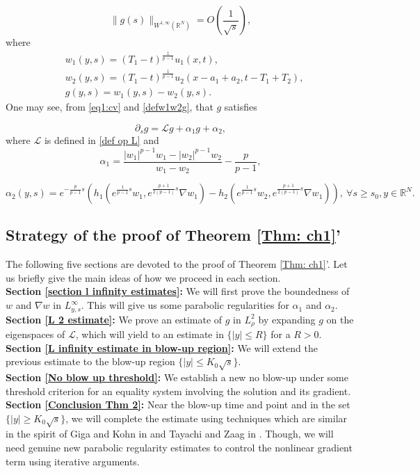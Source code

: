\documentclass[11pt,a4paper]{article}
\newcommand{\1}{\mathbbm{1}}
\numberwithin{equation}{section}
\newcommand{\numberset}{\mathbb}
\newcommand{\R}{\numberset{R}}
\theoremstyle{remark}
\begin{document}
\begin{equation}\label{eq:rough}
\|g(s)\|_{W^{1,\infty}(\R^N)}=O\left(\frac{1}{\sqrt{s}}\right),
\end{equation}
where 
\begin{equation}\label{defw1w2g}
\begin{aligned}
&w_1(y,s)=(T_1-t)^{\frac{1}{p-1}}u_1(x,t),\\
&w_2(y,s)=(T_1-t)^{\frac{1}{p-1}}u_2(x-a_1+a_2,t-T_1+T_2),\\
&g(y,s)=w_1(y,s)-w_2(y,s).
\end{aligned}
\end{equation}
One may see, from \eqref{eq1:cv} and \eqref{defw1w2g}, that $g$ satisfies

\begin{equation}\label{eq3: g}
\partial_s g=\mathcal{L}g+\alpha_1 g+\alpha_2,
\end{equation}
where $\mathcal{L}$ is defined in \eqref{def op L} and
\begin{equation}\label{alpha1}
\alpha_1=\frac{|w_1|^{p-1}w_1-|w_2|^{p-1}w_2}{w_1-w_2}-\frac{p}{p-1},
\end{equation}

\begin{equation}\label{alpha2}
\alpha_2(y,s)=e^{-\frac{p}{p-1} s}(h_1(e^{\frac{1}{p-1} s}w_1,e^{\frac{p+1}{2(p-1)} s}\nabla w_1)-h_2(e^{\frac{1}{p-1} s}w_2,e^{\frac{p+1}{2(p-1)} s}\nabla w_1)),\ \forall s\geq s_0, y\in \R^N.
\end{equation}

\subsection{Strategy of the proof of Theorem \ref{Thm: ch1}'}
The following five sections are devoted to the proof of Theorem \ref{Thm: ch1}'. Let us briefly give the main ideas of how we proceed in each section.\\
\textbf{Section \ref{section l infinity estimates}:} We will first prove the boundedness of $w$ and $\nabla w$ in $L^\infty_{y,s}$. This will give us some parabolic regularities for $\alpha_1$ and $\alpha_2$.\\
\textbf{Section \ref{L 2 estimate}:} We prove an estimate of $g$ in $L^2_\rho$ by expanding $g$ on the eigenspaces of $\mathcal{L}$, which will yield to an estimate in $\{|y|\leq R\}$ for a $R>0$.\\
\textbf{Section \ref{L infinity estimate in blow-up region}:} We will extend  the previous estimate to the blow-up region $\{|y|\leq K_0\sqrt{s}\}$.\\
\textbf{Section \ref{No blow up threshold}:} We establish a new no blow-up under some threshold criterion for an equality system involving the solution and its gradient.\\
\textbf{Section \ref{Conclusion Thm 2}:} Near the blow-up time and point and in the set $\{|y|\geq K_0\sqrt{s}\}$, we will complete the estimate using techniques which are similar in the spirit of Giga and Kohn in \cite{GK1989} and Tayachi and Zaag in \cite{TZ2015}. Though, we will need genuine new parabolic regularity estimates to control the nonlinear gradient term using iterative arguments.
\end{document}
